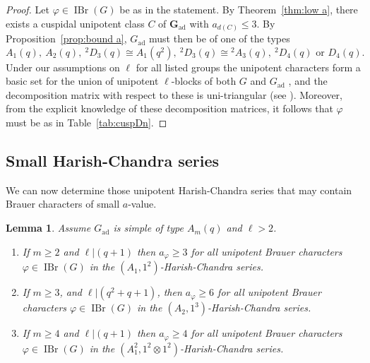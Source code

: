 \documentclass[12pt,leqno,a4paper]{amsart}
\newcommand{\bG}{{\mathbf{G}}}
\newcommand{\IBr}{{\operatorname{IBr}}}
\newcommand{\PGL}{{\operatorname{PGL}}}
\newcommand{\PGU}{{\operatorname{PGU}}}
\newcommand{\ad}{{\operatorname{ad}}}
\newcommand{\tw}[1]{{}^{#1}\!}
\let\vhi=\varphi
\newtheorem{lem}[thm]{Lemma}
\theoremstyle{remark}
\begin{document}
\begin{proof}
Let $\vhi\in\IBr(G)$ be as in the statement. By Theorem~\ref{thm:low a},
there exists a cuspidal unipotent class $C$ of $\bG_\ad$ with $a_{d(C)}\le3$.
By Proposition~\ref{prop:bound a}, $G_\ad$ must then be of one of the types
$$A_1(q),\ A_2(q),\ \tw2D_3(q)\cong A_1(q^2),\ \tw2D_3(q)\cong\tw2A_3(q),\
  \tw2D_4(q)\text{ or }D_4(q).$$
Under our assumptions on $\ell$ for all listed groups the unipotent characters
form a basic set for the union of unipotent $\ell$-blocks of both $G$ and
$G_\ad$ \cite{GH91,Ge93}, and the decomposition matrix with respect
to these is uni-triangular (see \cite{Ja90,DM15,GP92}).
Moreover, from the explicit knowledge of these decomposition matrices,
it follows that $\vhi$ must be as in Table~\ref{tab:cuspDn}.
\end{proof}

\subsection{Small Harish-Chandra series}
We can now determine those unipotent Harish-Chandra series that may contain
Brauer characters of small $a$-value.

\begin{lem}   \label{lem:a in A}
 Assume $G_\ad$ is simple of type $A_m(q)$ and $\ell>2$.
 \begin{enumerate}
  \item[\rm(a)] If $m\ge2$ and $\ell|(q+1)$ then $a_\vhi\ge3$ for all unipotent
   Brauer characters $\vhi\in\IBr(G)$ in the $(A_1,1^2)$-Harish-Chandra series.
  \item[\rm(b)] If $m\ge3$, and $\ell|(q^2+q+1)$, then $a_\vhi\ge6$ for all
   unipotent Brauer characters $\vhi\in\IBr(G)$ in the
   $(A_2,1^3)$-Harish-Chandra series.
  \item[\rm(c)] If $m\ge4$ and $\ell|(q+1)$ then $a_\vhi\ge4$ for all unipotent
   Brauer characters $\vhi\in\IBr(G)$ in the
   $(A_1^2,1^2\otimes1^2)$-Harish-Chandra series.
 \end{enumerate}
\end{lem}
\end{document}

